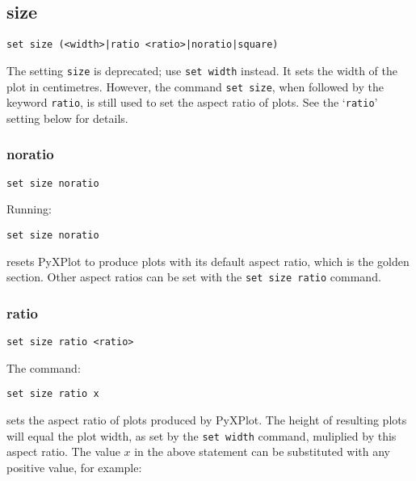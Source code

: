 \documentclass[a4paper,onecolumn,11pt]{book}
\begin{document}
\subsection{size}

\begin{verbatim}
set size (<width>|ratio <ratio>|noratio|square)
\end{verbatim}

The setting {\tt size} is deprecated; use {\tt set width} instead.  It sets the
width of the plot in centimetres. However, the command {\tt set size}, when
followed by the keyword {\tt ratio}, is still used to set the aspect ratio of
plots. See the `{\tt ratio}' setting below for details.

\subsubsection{noratio}

\begin{verbatim}
set size noratio
\end{verbatim}

Running:

\begin{verbatim}
set size noratio
\end{verbatim}

\noindent resets PyXPlot to produce plots with its default aspect ratio, which is the
golden section. Other aspect ratios can be set with the {\tt set size ratio}
command.


\subsubsection{ratio}

\begin{verbatim}
set size ratio <ratio>
\end{verbatim}

The command:

\begin{verbatim}
set size ratio x
\end{verbatim}

\noindent sets the aspect ratio of plots produced by PyXPlot.  The height of resulting
plots will equal the plot width, as set by the {\tt set width} command,
muliplied by this aspect ratio. The value $x$ in the above statement can be
substituted with any positive value, for example:
\end{document}
